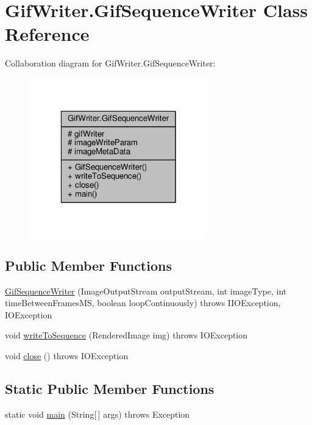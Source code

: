 \hypertarget{classGifWriter_1_1GifSequenceWriter}{\section{Gif\-Writer.\-Gif\-Sequence\-Writer Class Reference}
\label{classGifWriter_1_1GifSequenceWriter}
}


Collaboration diagram for Gif\-Writer.\-Gif\-Sequence\-Writer\-:\nopagebreak
\begin{figure}[H]
\begin{center}
\leavevmode
\includegraphics[width=220pt]{classGifWriter_1_1GifSequenceWriter__coll__graph}
\end{center}
\end{figure}
\subsection*{Public Member Functions}
\begin{DoxyCompactItemize}
\item 
\hyperlink{classGifWriter_1_1GifSequenceWriter_af253dbb98fab29cfc16fe44aab312ce9}{Gif\-Sequence\-Writer} (Image\-Output\-Stream output\-Stream, int image\-Type, int time\-Between\-Frames\-M\-S, boolean loop\-Continuously)  throws I\-I\-O\-Exception, I\-O\-Exception 
\item 
void \hyperlink{classGifWriter_1_1GifSequenceWriter_a98568199ba5d5e8e8bce8833c09a00d9}{write\-To\-Sequence} (Rendered\-Image img)  throws I\-O\-Exception 
\item 
void \hyperlink{classGifWriter_1_1GifSequenceWriter_ae66f740bdc81f3d4166a547134a6ea16}{close} ()  throws I\-O\-Exception 
\end{DoxyCompactItemize}
\subsection*{Static Public Member Functions}
\begin{DoxyCompactItemize}
\item 
static void \hyperlink{classGifWriter_1_1GifSequenceWriter_ad32b90ad377d9289a47cfda34337d905}{main} (String\mbox{[}$\,$\mbox{]} args)  throws Exception 
\end{DoxyCompactItemize}
